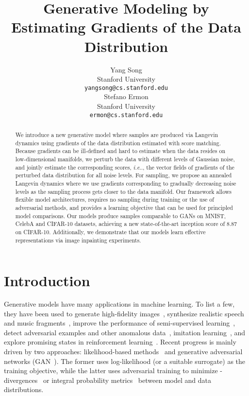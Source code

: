 \documentclass{article}
\title{Generative Modeling by Estimating Gradients of the Data Distribution}
\author{Yang Song\\
  Stanford University\\
  \texttt{yangsong@cs.stanford.edu}\\
  \And
  Stefano Ermon\\
  Stanford University\\
  \texttt{ermon@cs.stanford.edu}
}
\makeatletter
\def\@onedot{\ifx\@let@token.\else.\null\fi\xspace}
\DeclareRobustCommand\onedot{\futurelet\@let@token\@onedot}
\def\ie{\emph{i.e}\onedot}
\makeatother
\begin{document}
\maketitle
\begin{abstract}
We introduce a new generative model where samples are produced 
via Langevin dynamics using gradients of the data distribution estimated with score matching. 
Because gradients can be ill-defined and hard to estimate when the data resides on low-dimensional manifolds, 
we perturb the data with different levels of Gaussian noise, and jointly estimate the corresponding scores, \ie, the vector fields of gradients of the perturbed data distribution for all noise levels. For sampling, we propose an annealed Langevin dynamics where we use gradients corresponding to gradually decreasing noise levels as the 
sampling process
gets closer 
to the data manifold. 
Our framework allows flexible model architectures, requires no sampling during training or the use of adversarial methods, and provides a learning objective that can be used for principled 
model comparisons. Our models produce samples 
comparable 
to GANs on MNIST, CelebA and CIFAR-10 datasets, achieving a new state-of-the-art inception score of 8.87 
on CIFAR-10. Additionally, we demonstrate that our models learn effective representations via image inpainting experiments.
\end{abstract} \section{Introduction}
Generative models have many applications in machine learning. 
To list a few, they have been used to generate high-fidelity images~\cite{karras2018style,brock2018large}, synthesize realistic speech and music fragments~\cite{oord2016wavenet}, improve the performance of semi-supervised learning~\cite{kingma2014semi, dai2017good}, detect adversarial examples and other anomalous data~\cite{song2018pixeldefend}, imitation learning~\cite{ho2016generative}, and explore promising states in reinforcement learning~\cite{ostrovski2017count}.
Recent progress 
is mainly driven by two 
approaches: likelihood-based methods~\cite{graves2013generating, kingma2014auto, dinh2014nice, oord2016pixel} and generative adversarial networks (GAN~\cite{goodfellow2014generative}). The former uses log-likelihood (or a suitable surrogate) as the training objective, while the latter uses adversarial training to minimize -divergences~\cite{nowozin2016f} or integral probability metrics~\cite{arjovsky2017wasserstein,sriperumbudur2009integral} between model and data distributions. 
\end{document}
